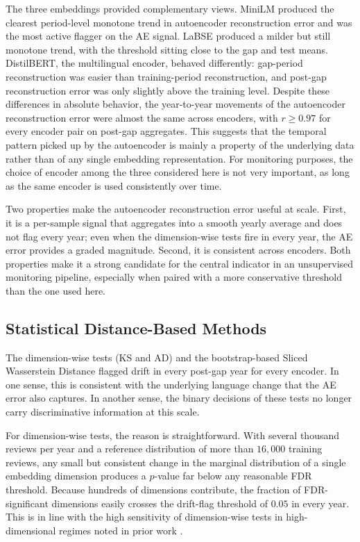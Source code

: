 \documentclass[conference]{IEEEtran}
\begin{document}
The three embeddings provided complementary views. MiniLM produced the clearest period-level monotone trend in autoencoder reconstruction error and was the most active flagger on the AE signal. LaBSE produced a milder but still monotone trend, with the threshold sitting close to the gap and test means. DistilBERT, the multilingual encoder, behaved differently: gap-period reconstruction was easier than training-period reconstruction, and post-gap reconstruction error was only slightly above the training level. Despite these differences in absolute behavior, the year-to-year movements of the autoencoder reconstruction error were almost the same across encoders, with $r \geq 0.97$ for every encoder pair on post-gap aggregates. This suggests that the temporal pattern picked up by the autoencoder is mainly a property of the underlying data rather than of any single embedding representation. For monitoring purposes, the choice of encoder among the three considered here is not very important, as long as the same encoder is used consistently over time.

Two properties make the autoencoder reconstruction error useful at scale. First, it is a per-sample signal that aggregates into a smooth yearly average and does not flag every year; even when the dimension-wise tests fire in every year, the AE error provides a graded magnitude. Second, it is consistent across encoders. Both properties make it a strong candidate for the central indicator in an unsupervised monitoring pipeline, especially when paired with a more conservative threshold than the one used here.

\subsection{Statistical Distance-Based Methods}

The dimension-wise tests (KS and AD) and the bootstrap-based Sliced Wasserstein Distance flagged drift in every post-gap year for every encoder. In one sense, this is consistent with the underlying language change that the AE error also captures. In another sense, the binary decisions of these tests no longer carry discriminative information at this scale.

For dimension-wise tests, the reason is straightforward. With several thousand reviews per year and a reference distribution of more than $16{,}000$ training reviews, any small but consistent change in the marginal distribution of a single embedding dimension produces a $p$-value far below any reasonable FDR threshold. Because hundreds of dimensions contribute, the fraction of FDR-significant dimensions easily crosses the drift-flag threshold of $0.05$ in every year. This is in line with the high sensitivity of dimension-wise tests in high-dimensional regimes noted in prior work \cite{lu2018,abghani2020}.
\end{document}
